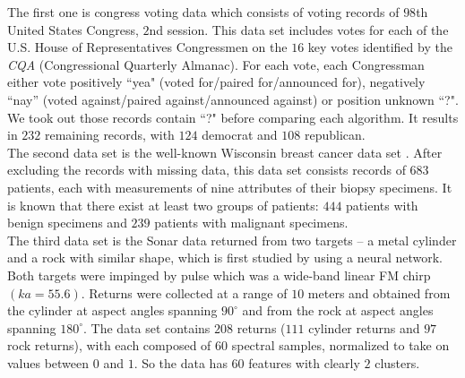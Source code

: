 \documentclass[11pt]{article}
\begin{document}
The first one is congress voting data which consists of voting records of $98$th United States Congress, $2$nd session. This data set includes votes for each of the U.S. House of Representatives Congressmen on the $16$ key votes identified by the \textit{CQA} (Congressional Quarterly Almanac). For each vote, each Congressman either vote positively ``yea" (voted for/paired for/announced for),  negatively ``nay'' (voted against/paired against/announced against) or position unknown ``?". We took out those records contain ``?" before comparing each algorithm. It results in $232$ remaining records, with $124$ democrat and $108$ republican. \\

The second data set is the well-known Wisconsin breast cancer data set \citep{mangasarian1990pattern}. After excluding the records with missing data, this data set consists records of $683$ patients, each with measurements of nine attributes of their biopsy specimens. It is known that there exist at least two groups of patients: $444$ patients with benign specimens and $239$ patients with malignant specimens.\\

The third data set is the Sonar data returned from two targets -- a metal cylinder and a rock with similar shape, which is first studied by \cite{gorman1988analysis} using a neural network. Both targets were impinged by pulse which was a wide-band linear FM chirp $(ka = 55.6)$. Returns were collected at a range of $10$ meters and obtained from the cylinder at aspect angles spanning $90^{\circ}$ and from the rock at aspect angles spanning $180^{\circ}$. The data set contains $208$ returns ($111$ cylinder returns and $97$ rock returns), with each composed of $60$ spectral samples, normalized to take on values between $0$ and $1$. So the data has $60$ features with clearly $2$ clusters. 
\end{document}

